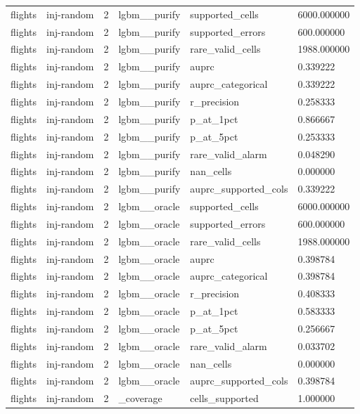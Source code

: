 \begin{tabular}{llllll}
flights & inj-random & 2 & lgbm\_\_purify & supported\_cells & 6000.000000 \\
flights & inj-random & 2 & lgbm\_\_purify & supported\_errors & 600.000000 \\
flights & inj-random & 2 & lgbm\_\_purify & rare\_valid\_cells & 1988.000000 \\
flights & inj-random & 2 & lgbm\_\_purify & auprc & 0.339222 \\
flights & inj-random & 2 & lgbm\_\_purify & auprc\_categorical & 0.339222 \\
flights & inj-random & 2 & lgbm\_\_purify & r\_precision & 0.258333 \\
flights & inj-random & 2 & lgbm\_\_purify & p\_at\_1pct & 0.866667 \\
flights & inj-random & 2 & lgbm\_\_purify & p\_at\_5pct & 0.253333 \\
flights & inj-random & 2 & lgbm\_\_purify & rare\_valid\_alarm & 0.048290 \\
flights & inj-random & 2 & lgbm\_\_purify & nan\_cells & 0.000000 \\
flights & inj-random & 2 & lgbm\_\_purify & auprc\_supported\_cols & 0.339222 \\
flights & inj-random & 2 & lgbm\_\_oracle & supported\_cells & 6000.000000 \\
flights & inj-random & 2 & lgbm\_\_oracle & supported\_errors & 600.000000 \\
flights & inj-random & 2 & lgbm\_\_oracle & rare\_valid\_cells & 1988.000000 \\
flights & inj-random & 2 & lgbm\_\_oracle & auprc & 0.398784 \\
flights & inj-random & 2 & lgbm\_\_oracle & auprc\_categorical & 0.398784 \\
flights & inj-random & 2 & lgbm\_\_oracle & r\_precision & 0.408333 \\
flights & inj-random & 2 & lgbm\_\_oracle & p\_at\_1pct & 0.583333 \\
flights & inj-random & 2 & lgbm\_\_oracle & p\_at\_5pct & 0.256667 \\
flights & inj-random & 2 & lgbm\_\_oracle & rare\_valid\_alarm & 0.033702 \\
flights & inj-random & 2 & lgbm\_\_oracle & nan\_cells & 0.000000 \\
flights & inj-random & 2 & lgbm\_\_oracle & auprc\_supported\_cols & 0.398784 \\
flights & inj-random & 2 & \_coverage & cells\_supported & 1.000000 \\

\end{tabular}
